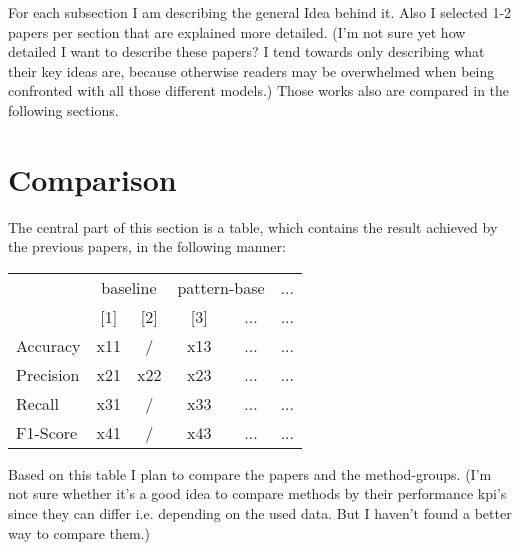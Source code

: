 \documentclass[sigconf,  review=false, nonacm=true]{acmart}
\begin{document}
For each subsection I am describing the general Idea behind it. Also I selected 1-2 papers per section that are explained more detailed. (I'm not sure yet how detailed I want to describe these papers? I tend towards only describing what their key ideas are, because otherwise readers may be overwhelmed when being confronted with all those different models.) Those works also are compared in the following sections. 


\section{Comparison}

The central part of this section is a table, which contains the result achieved by the previous papers, in the following manner:

% 
\begin{table}[H]
\begin{tabular}{|l|cc|cc|c|}
\hline
\multirow{2}{*}{} & \multicolumn{2}{c|}{baseline}          & \multicolumn{2}{c|}{pattern-base}  & ... \\ \cline{2-6} 
                  & \multicolumn{1}{c|}{{[}1{]}} & {[}2{]} & \multicolumn{1}{c|}{{[}3{]}} & ... & ... \\ \hline
Accuracy          & \multicolumn{1}{c|}{x11}     & /       & \multicolumn{1}{c|}{x13}     & ... & ... \\ \hline
Precision         & \multicolumn{1}{c|}{x21}     & x22     & \multicolumn{1}{c|}{x23}     & ... & ... \\ \hline
Recall            & \multicolumn{1}{c|}{x31}     & /       & \multicolumn{1}{c|}{x33}     & ... & ... \\ \hline
F1-Score          & \multicolumn{1}{c|}{x41}     & /       & \multicolumn{1}{c|}{x43}     & ... & ... \\ \hline
\end{tabular}
\end{table}
Based on this table I plan to compare the papers and the method-groups. (I'm not sure whether it's a good idea to compare methods by their performance kpi's since they can differ i.e. depending on the used data. But I haven't found a better way to compare them.)
\end{document}
